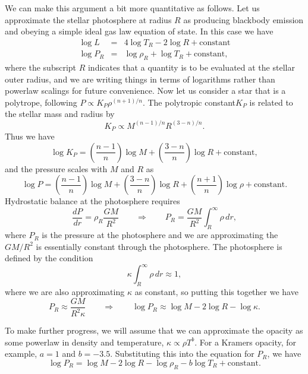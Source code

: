 We can make this argument a bit more quantitative as follows. Let us approximate the stellar photosphere at radius $R$ as producing blackbody emission and obeying a simple ideal gas law equation of state. In this case we have
\begin{eqnarray}
\label{eq:bb}
\log L & = & 4 \log T_R - 2 \log R + \mbox{constant} \\
\label{eq:idealgas}
\log P_R & = & \log \rho_R + \log T_R + \mbox{constant},
\end{eqnarray}
where the subscript $R$ indicates that a quantity is to be evaluated at the stellar outer radius, and we are writing things in terms of logarithms rather than powerlaw scalings for future convenience. Now let us consider a star that is a polytrope, following $P\propto K_P \rho^{(n+1)/n}$. The polytropic constant$K_P$ is related to the stellar mass and radius by
\begin{equation}
K_P \propto M^{(n-1)/n}R^{(3-n)/n}.
\end{equation}
Thus we have
\begin{equation}
\log K_P = \left(\frac{n-1}{n}\right) \log M + \left(\frac{3-n}{n}\right)\log R + \mbox{constant},
\end{equation}
and the pressure scales with $M$ and $R$ as
\begin{equation}
\label{eq:polytrope}
\log P = \left(\frac{n-1}{n}\right) \log M + \left(\frac{3-n}{n}\right) \log R + \left(\frac{n+1}{n}\right) \log \rho + \mbox{constant}.
\end{equation}
Hydrostatic balance at the photosphere requires
\begin{equation}
\frac{dP}{dr} = \rho_R \frac{GM}{R^2} \qquad\Longrightarrow\qquad
P_R = \frac{GM}{R^2} \int_R^\infty \rho \, dr,
\end{equation}
where $P_R$ is the pressure at the photosphere and we are approximating the $GM/R^2$ is essentially constant through the photosphere. The photosphere is defined by the condition
\begin{equation}
\kappa \int_R^\infty \rho\,dr \approx 1,
\end{equation}
where we are also approximating $\kappa$ as constant, so putting this together we have
\begin{equation}
P_R \approx \frac{GM}{R^2\kappa} \qquad\Longrightarrow\qquad
\log P_R \approx \log M - 2 \log R - \log \kappa.
\end{equation}

To make further progress, we will assume that we can approximate the opacity as some powerlaw in density and temperature, $\kappa \propto \rho T^b$. For a Kramers opacity, for example, $a=1$ and $b=-3.5$. Substituting this into the equation for $P_R$, we have
\begin{equation}
\label{eq:opacity}
\log P_R = \log M - 2\log R - \log \rho_R - b\log T_R + \mbox{constant}.
\end{equation}

